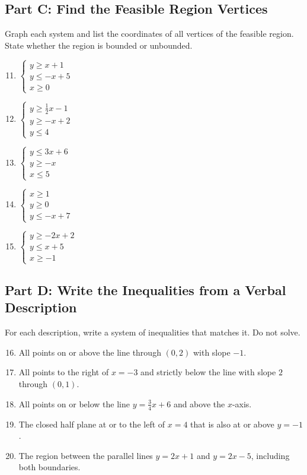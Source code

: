 \documentclass[12pt]{article}
\begin{document}
\subsection*{Part C: Find the Feasible Region Vertices}
Graph each system and list the coordinates of all vertices of the feasible region. State whether the region is bounded or unbounded.
\begin{enumerate}
  \setcounter{enumi}{10}
  \item \(\begin{cases} y \ge x + 1 \\ y \le -x + 5 \\ x \ge 0 \end{cases}\)
  \item \(\begin{cases} y \ge \tfrac{1}{2}x - 1 \\ y \ge -x + 2 \\ y \le 4 \end{cases}\)
  \item \(\begin{cases} y \le 3x + 6 \\ y \ge -x \\ x \le 5 \end{cases}\)
  \item \(\begin{cases} x \ge 1 \\ y \ge 0 \\ y \le -x + 7 \end{cases}\)
  \item \(\begin{cases} y \ge -2x + 2 \\ y \le x + 5 \\ x \ge -1 \end{cases}\)
\end{enumerate}

\subsection*{Part D: Write the Inequalities from a Verbal Description}
For each description, write a system of inequalities that matches it. Do not solve.
\begin{enumerate}
  \setcounter{enumi}{15}
  \item All points on or above the line through \((0,2)\) with slope \(-1\).
  \item All points to the right of \(x = -3\) and strictly below the line with slope \(2\) through \((0,1)\).
  \item All points on or below the line \(y = \tfrac{3}{4}x + 6\) and above the \(x\)-axis.
  \item The closed half plane at or to the left of \(x = 4\) that is also at or above \(y = -1\).
  \item The region between the parallel lines \(y = 2x + 1\) and \(y = 2x - 5\), including both boundaries.
\end{enumerate}
\end{document}
